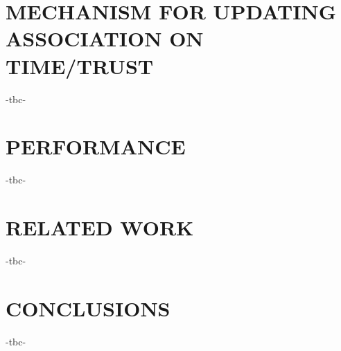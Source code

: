 \documentclass[sigconf]{acmart}
\begin{document}
\section{MECHANISM FOR UPDATING ASSOCIATION ON TIME/TRUST}
-tbc-
\section{PERFORMANCE}
-tbc-
\section{RELATED WORK}
-tbc-
\section{CONCLUSIONS}
-tbc-

\begin{thebibliography}{99}


\end{thebibliography}
\end{document}
